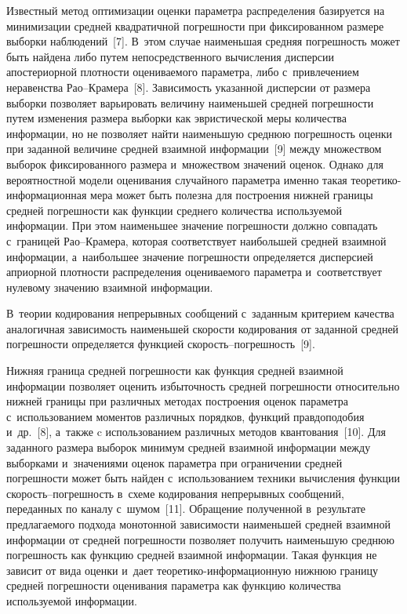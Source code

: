 \begin{multicols}{2}
Известный метод оптимизации оценки параметра распределения базируется на минимизации 
средней квадратичной по\-греш\-ности при фиксированном размере выборки наблюдений~[7]. 
В~этом случае наименьшая сред\-няя по\-греш\-ность может быть найдена либо путем 
непосредственного вы\-чис\-ле\-ния дисперсии апостериорной плот\-ности оце\-ни\-ва\-емо\-го па\-ра\-мет\-ра, 
либо с~привлечением неравенства Рао--Кра\-ме\-ра~[8]. За\-ви\-си\-мость указанной дисперсии от 
размера выборки позволяет варьировать величину наименьшей сред\-ней по\-греш\-ности путем 
изменения размера выборки как эвристической меры количества информации, но не позволяет 
найти наименьшую среднюю погрешность оценки при заданной величине средней взаимной 
информации~[9] между множеством выборок фиксированного размера и~множеством значений 
оценок. Однако для вероятностной модели оценивания случайного параметра именно такая 
тео\-ре\-ти\-ко-ин\-фор\-ма\-ци\-он\-ная мера может быть полезна для построения ниж\-ней границы средней 
погрешности как функции среднего количества ис\-поль\-зу\-емой информации. При этом 
наименьшее значение по\-греш\-ности долж\-но совпадать с~границей Рао--Кра\-ме\-ра, 
которая соответствует наибольшей сред\-ней взаимной информации, а~наибольшее значение 
 по\-греш\-ности определяется дис\-пер\-си\-ей априорной плот\-ности распределения 
оце\-ни\-ва\-емо\-го па\-ра\-мет\-ра и~соответствует нулевому значению взаимной информации. 

В~теории 
кодирования непрерывных сообщений с~заданным критерием качества аналогичная 
зависимость наименьшей ско\-рости кодирования от заданной средней погрешности 
определяется функцией ско\-рость--по\-греш\-ность~[9]. 

Нижняя граница средней погрешности как функция средней взаимной информации позволяет 
оценить избыточность сред\-ней по\-греш\-ности относительно нижней границы при различных 
методах построения оценок па\-ра\-мет\-ра с~использованием моментов различных порядков, 
функций правдоподобия и~др.~[8], а~также c использованием различных методов 
квантования~[10]. Для заданного размера выборок минимум средней взаимной информации 
между выборками и~значениями оценок па\-ра\-мет\-ра при ограничении средней погрешности 
может быть найден с~использованием техники вы\-чис\-ле\-ния функции ско\-рость--по\-греш\-ность 
в~схеме кодирования непрерывных сообщений, переданных по каналу с~шумом~[11]. 
Обращение полученной в~результате пред\-ла\-га\-емо\-го подхода монотонной зависимости 
наименьшей средней взаимной информации от сред\-ней по\-греш\-ности позволяет получить 
наименьшую среднюю по\-греш\-ность как функцию средней взаимной информации. Такая 
функция не зависит от вида оценки и~дает тео\-ре\-ти\-ко-ин\-фор\-ма\-ци\-он\-ную нижнюю границу 
сред\-ней по\-греш\-ности оце\-ни\-ва\-ния па\-ра\-мет\-ра как функцию количества ис\-поль\-зу\-емой 
информации.


\end{multicols}
